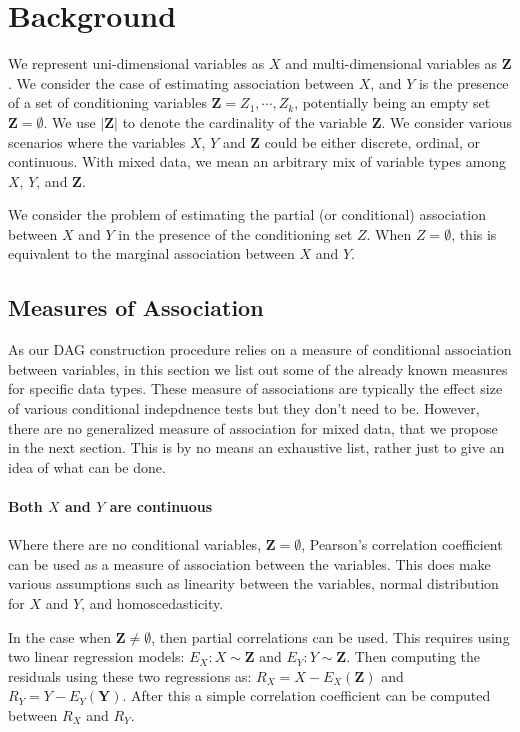 \documentclass[letterpaper]{article} %
\begin{document}
\section{Background}
\label{sec:background}
We represent uni-dimensional variables as $ X $ and multi-dimensional variables
as $ \bm{Z} $. We consider the case of estimating association between $ X $,
and $ Y $ is the presence of a set of conditioning variables $ \bm{Z} = Z_1,
\cdots, Z_k $, potentially being an empty set $ \bm{Z} = \emptyset $. We use $
\rvert \bm{Z} \rvert $ to denote the cardinality of the variable $ \bm{Z} $. We
consider various scenarios where the variables $ X $, $ Y $ and $ \bm{Z} $
could be either discrete, ordinal, or continuous. With mixed data, we mean an
arbitrary mix of variable types among $ X $, $ Y $, and $ \bm{Z} $.

We consider the problem of estimating the partial (or conditional) association
between $ X $ and $ Y $ in the presence of the conditioning set $ Z $. When $ Z
= \emptyset $, this is equivalent to the marginal association between $ X $ and
$ Y $.


\subsection{Measures of Association}
As our DAG construction procedure relies on a measure of conditional
association between variables, in this section we list out some of the already
known measures for specific data types. These measure of associations are
typically the effect size of various conditional indepdnence tests but they
don't need to be. However, there are no generalized measure of association for
mixed data, that we propose in the next section. This is by no means an
exhaustive list, rather just to give an idea of what can be done.

\paragraph{Both $ X $ and $ Y $ are continuous}
Where there are no conditional variables, $ \bm{Z} = \emptyset $, Pearson's
correlation coefficient can be used as a measure of association between the
variables. This does make various assumptions such as linearity between the
variables, normal distribution for $ X $ and $ Y $, and homoscedasticity.

In the case when $ \bm{Z} \neq \emptyset $, then partial correlations can be
used. This requires using two linear regression models: $ E_X: X \sim \bm{Z} $
and $ E_Y: Y \sim \bm{Z} $. Then computing the residuals using these two
regressions as: $ R_X = X - E_X(\bm{Z}) $ and $ R_Y = Y - E_Y(\bm{Y}) $. After
this a simple correlation coefficient can be computed between $ R_X $ and $ R_Y $.
\end{document}
